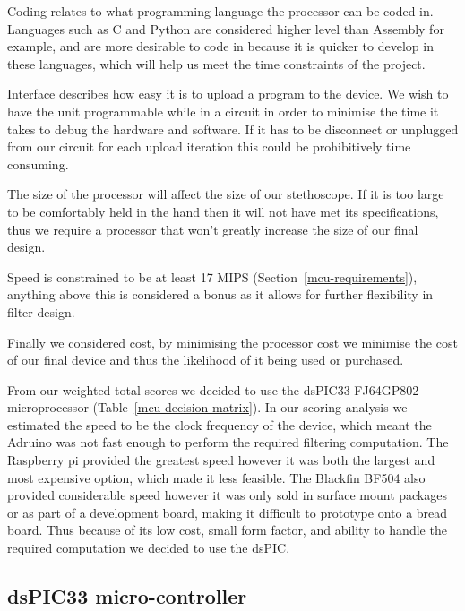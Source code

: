 Coding relates to what programming language the processor can be coded in. Languages such as C and Python are considered higher level than Assembly for example, and are more desirable to code in because it is quicker to develop in these languages, which will help us meet the time constraints of the project. 

Interface describes how easy it is to upload a program to the device. We wish to have the unit programmable while in a circuit in order to minimise the time it takes to debug the hardware and software. If it has to be disconnect or unplugged from our circuit for each upload iteration this could be prohibitively time consuming. 

The size of the processor will affect the size of our stethoscope. If it is too large to be comfortably held in the hand then it will not have met its specifications, thus we require a processor that won't greatly increase the size of our final design.

Speed is constrained to be at least 17 MIPS (Section~\ref{mcu-requirements}), anything above this is considered a bonus as it allows for further flexibility in filter design. 

Finally we considered cost, by minimising the processor cost we minimise the cost of our final device and thus the likelihood of it being used or purchased.

From our weighted total scores we decided to use the dsPIC33-FJ64GP802 microprocessor (Table~\ref{mcu-decision-matrix}). In our scoring analysis we estimated the speed to be the clock frequency of the device, which meant the Adruino was not fast enough to perform the required filtering computation. The Raspberry pi provided the greatest speed however it was both the largest and most expensive option, which made it less feasible. The Blackfin BF504 also provided considerable speed however it was only sold in surface mount packages or as part of a development board, making it difficult to prototype onto a bread board. Thus because of its low cost, small form factor, and ability to handle the required computation we decided to use the dsPIC.



\subsection{dsPIC33 micro-controller}
